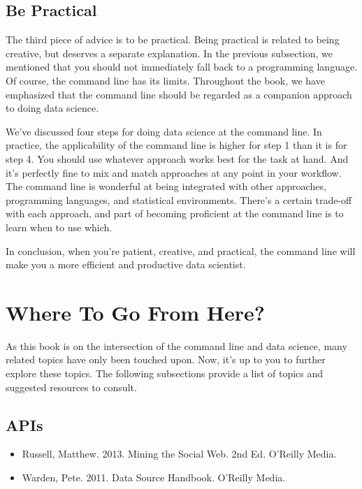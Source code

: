 \documentclass[
]{book}
\providecommand{\tightlist}{%
  \setlength{\itemsep}{0pt}\setlength{\parskip}{0pt}}
\theoremstyle{definition}
\theoremstyle{definition}
\theoremstyle{definition}
\theoremstyle{remark}
\begin{document}
\hypertarget{be-practical}{%
\subsection{Be Practical}\label{be-practical}}

The third piece of advice is to be practical. Being practical is related to being creative, but deserves a separate explanation. In the previous subsection, we mentioned that you should not immediately fall back to a programming language. Of course, the command line has its limits. Throughout the book, we have emphasized that the command line should be regarded as a companion approach to doing data science.

We've discussed four steps for doing data science at the command line. In practice, the applicability of the command line is higher for step 1 than it is for step 4. You should use whatever approach works best for the task at hand. And it's perfectly fine to mix and match approaches at any point in your workflow. The command line is wonderful at being integrated with other approaches, programming languages, and statistical environments. There's a certain trade-off with each approach, and part of becoming proficient at the command line is to learn when to use which.

In conclusion, when you're patient, creative, and practical, the command line will make you a more efficient and productive data scientist.

\hypertarget{where-to-go-from-here}{%
\section{Where To Go From Here?}\label{where-to-go-from-here}}

As this book is on the intersection of the command line and data science, many related topics have only been touched upon. Now, it's up to you to further explore these topics. The following subsections provide a list of topics and suggested resources to consult.

\hypertarget{apis}{%
\subsection{APIs}\label{apis}}

\begin{itemize}
\tightlist
\item
  Russell, Matthew. 2013. Mining the Social Web. 2nd Ed. O'Reilly Media.
\item
  Warden, Pete. 2011. Data Source Handbook. O'Reilly Media.
\end{itemize}
\end{document}
